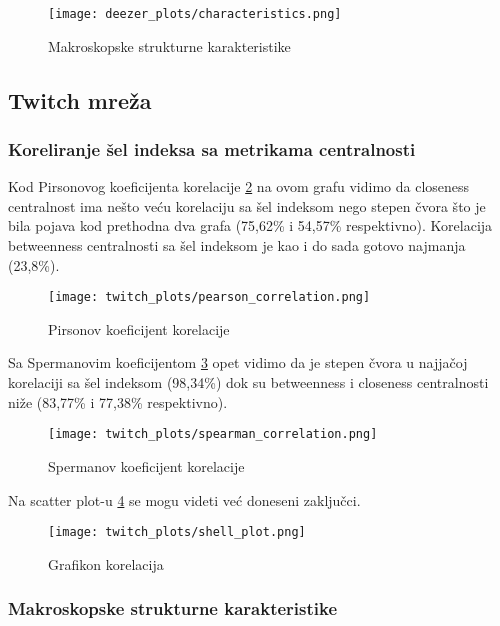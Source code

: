 \documentclass[11pt,a4paper]{article}
\begin{document}
\begin{figure}
    \centering
    \texttt{[image: deezer\_plots/characteristics.png]}
    \caption{Makroskopske strukturne karakteristike}
    \label{fig:deezer-karakteristike}
\end{figure}

\subsection{Twitch mre\v za}

\subsubsection{Koreliranje \v sel indeksa sa metrikama centralnosti}

Kod Pirsonovog koeficijenta korelacije \ref{fig:twitch-prison} na ovom grafu vidimo da closeness centralnost ima ne\v sto ve\' cu korelaciju sa \v sel indeksom nego stepen \v cvora \v sto je bila pojava kod prethodna dva grafa (75,62\% i 54,57\% respektivno). Korelacija betweenness centralnosti sa \v sel indeksom je kao i do sada gotovo najmanja (23,8\%).

\begin{figure}[h!]
    \centering
    \texttt{[image: twitch\_plots/pearson\_correlation.png]}
    \caption{Pirsonov koeficijent korelacije}
    \label{fig:twitch-prison}
\end{figure}

Sa Spermanovim koeficijentom \ref{fig:twitch-sperman} opet vidimo da je stepen \v cvora u najja\v coj korelaciji sa \v sel indeksom (98,34\%) dok su betweenness i closeness centralnosti ni\v ze (83,77\% i 77,38\% respektivno).

\begin{figure}
    \centering
    \texttt{[image: twitch\_plots/spearman\_correlation.png]}
    \caption{Spermanov koeficijent korelacije}
    \label{fig:twitch-sperman}
\end{figure}

Na scatter plot-u \ref{fig:twitch-korelacije} se mogu videti ve\' c doneseni zaklju\v cci.

\begin{figure}
    \centering
    \texttt{[image: twitch\_plots/shell\_plot.png]}
    \caption{Grafikon korelacija}
    \label{fig:twitch-korelacije}
\end{figure}

\subsubsection{Makroskopske strukturne karakteristike}
\end{document}
